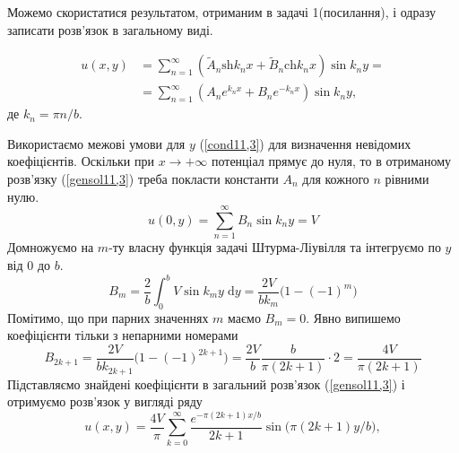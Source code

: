 Можемо скористатися результатом, отриманим в задачі 1(посилання), і одразу записати розв'язок в загальному виді.

\begin{equation} \label{gensol11,3}
    \begin{aligned}
        u(x,y) &= \sum_{n=1}^{\infty} \left(\tilde{A}_n\mathrm{sh}k_nx + \tilde{B}_n\mathrm{ch}k_nx\right) \sin k_ny =\\
        &= \sum_{n=1}^{\infty} \left(A_n e^{k_nx} + B_ne^{-k_nx}\right) \sin k_ny,
    \end{aligned}
\end{equation}
де $k_n = \pi n/b$.

Використаємо межові умови для $y$ (\ref{cond11,3}) для визначення невідомих коефіцієнтів. Оскільки при $x \to +\infty$ потенціал прямує до нуля, то в отриманому розв'язку (\ref{gensol11,3}) треба покласти константи $A_n$ для кожного $n$ рівними нулю.  
\begin{equation*}
    u(0,y) = \sum_{n=1}^{\infty} B_n \sin k_ny = V
\end{equation*}
Домножуємо на $m$-ту власну функція задачі Штурма-Ліувілля та інтегруємо по $y$ від $0$ до $b$.
\begin{equation*}
    B_m = \frac{2}{b} \int_0^b V \sin k_m y \;\mathrm{d}y = \frac{2V}{bk_m} \big(1 - (-1)^m\big)
\end{equation*}
Помітимо, що при парних значеннях $m$ маємо $B_m = 0$. Явно випишемо коефіцієнти тільки з непарними номерами
\begin{equation}
    B_{2k+1} = \frac{2V}{bk_{2k+1}} \big(1 - (-1)^{2k+1}\big) = \frac{2V}{b} \frac{b}{\pi (2k+1)} \cdot 2 = \frac{4V}{\pi (2k+1)}
\end{equation}
Підставляємо знайдені коефіцієнти в загальний розв'язок (\ref{gensol11,3}) і отримуємо розв'язок у вигляді ряду
\begin{equation} 
    u(x,y) = \frac{4V}{\pi} \sum_{k=0}^{\infty} \frac{e^{-\pi(2k+1)x/b}}{2k+1} \sin\big(\pi(2k+1)y/b\big),
\end{equation}

